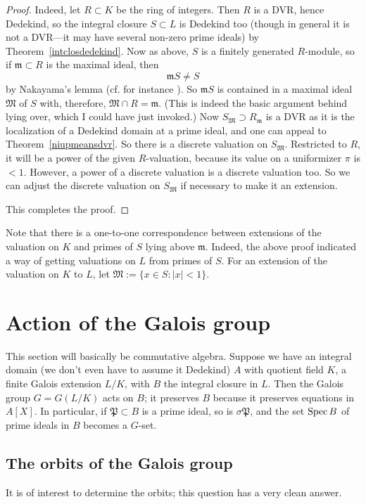 \begin{proof}
Indeed, let $R \subset K$ be the ring of integers.  Then $R$ is a DVR, hence Dedekind, so the integral closure $S \subset L$ is Dedekind too (though in general it is not   a DVR---it may have several non-zero prime ideals) by Theorem~\ref{intclosdedekind}.  Now as above, $S$ is a finitely generated $R$-module, so if $\mathfrak{m} \subset R$ is the maximal ideal, then 
\[ \mathfrak{m} S \neq S \]
by Nakayama's lemma (cf. for instance \cite{Ei95}).  So $\mathfrak{m} S$ is contained in a maximal ideal $\mathfrak{M}$ of $S$ with, therefore, $\mathfrak{M} \cap R = \mathfrak{m}$.  (This is indeed the basic argument behind lying over, which I could have just invoked.) Now $S_{\mathfrak{M}} \supset R_{\mathfrak{m}}$ is a DVR as it is the localization of a Dedekind domain at a prime ideal, and one can appeal to Theorem~\ref{niupmeansdvr}.  So there is a discrete valuation on $S_{\mathfrak{M}}$.  Restricted to $R$, it will be a power of the given $R$-valuation, because its value on a uniformizer $\pi$ is $<1$.  However, a power of a discrete valuation is a discrete valuation too.  So we can adjust the discrete valuation on $S_{\mathfrak{M}}$ if necessary to make it an extension.

This completes the proof.  
\end{proof}

Note that there is a one-to-one correspondence between extensions of the valuation on $K$ and primes of $S$ lying above $\mathfrak{m}$.   Indeed, the above proof indicated a way of getting valuations on $L$ from primes of $S$.  For an extension of the valuation on $K$ to $L$, let $\mathfrak{M} := \{ x \in S: \left| x \right| < 1\}$.
\section{Action of the Galois group}

This section will basically be commutative algebra.  Suppose we have an integral domain (we don't even have to assume it Dedekind) $A$ with quotient field $K$, a finite Galois extension $L/K$, with $B$ the integral closure in $L$.  Then the Galois group $G = G(L/K)$ acts on $B$; it preserves $B$ because it preserves equations in $A[X]$.
In particular, if $\mathfrak{P} \subset B$ is a prime ideal, so is $\sigma \mathfrak{P}$, and the set $\operatorname{Spec} B$ of prime ideals in $B$ becomes a $G$-set.

\subsection{The orbits of the Galois group} It is of interest to determine the orbits; this question has  a very clean answer.

